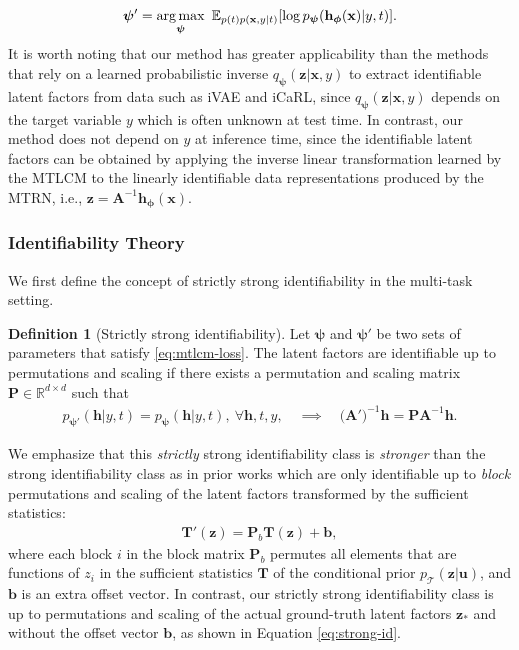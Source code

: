 \documentclass{article} %
\theoremstyle{plain}
\theoremstyle{definition}
\newtheorem{definition}[theorem]{Definition}
\theoremstyle{remark}
\begin{document}
\begin{align}\label{eq:mtlcm-loss}
    \boldsymbol{\psi}'=\operatorname*{arg\,max}_{\boldsymbol{\psi}}~\mathbb{E}_{p(t)p(\mathbf{x},y|t)}[\log p_{\boldsymbol{\psi}}(\mathbf{h}_{\boldsymbol{\phi}}(\mathbf{x})|y,t)].
\end{align}
It is worth noting that our method has greater applicability than the methods that rely on a learned probabilistic inverse $q_{\boldsymbol{\psi}}(\mathbf{z}|\mathbf{x},y)$ to extract identifiable latent factors from data such as iVAE and iCaRL, since $q_{\boldsymbol{\psi}}(\mathbf{z}|\mathbf{x},y)$ depends on the target variable $y$ which is often unknown at test time. In contrast, our method does not depend on $y$ at inference time, since the identifiable latent factors can be obtained by applying the inverse linear transformation learned by the MTLCM to the linearly identifiable data representations produced by the MTRN, i.e., $\mathbf{z}=\mathbf{A}^{-1}\mathbf{h}_{\boldsymbol{\phi}}(\mathbf{x})$.

\vspace{-0.5ex}
\subsubsection{Identifiability Theory}
\vspace{-0.5ex}
We first define the concept of strictly strong identifiability in the multi-task setting.
\begin{definition}[Strictly strong identifiability]\label{def:strong-id}
    Let $\boldsymbol{\psi}$ and $\boldsymbol{\psi}'$ be two sets of parameters that satisfy \eqref{eq:mtlcm-loss}. The latent factors are identifiable up to permutations and scaling if there exists a permutation and scaling matrix $\mathbf{P}\in\mathbb{R}^{d\times d}$ 
    such that 
    \begin{align}\label{eq:strong-id}
            p_{\boldsymbol{\psi}'}(\mathbf{h}|y,t)=p_{\boldsymbol{\psi}}(\mathbf{h}|y,t),~\forall \mathbf{h},t,y,
            \quad\implies\quad
            (\mathbf{A')}^{-1}\mathbf{h}=\mathbf{P}\mathbf{A}^{-1}\mathbf{h}.
    \end{align}
\end{definition}
\vspace{-0.5ex}
We emphasize that this \textit{strictly} strong identifiability class is \textit{stronger} than the strong identifiability class as in prior works \citep{Khemakhem_Kingma_Monti_Hyvarinen_2020,Lu_Wu_Hernandez-Lobato_Scholkopf_2022} which are only identifiable up to \textit{block} permutations and scaling of the latent factors transformed by the sufficient statistics:
\begin{align}
    \mathbf{T}'(\mathbf{z})=\mathbf{P}_b\mathbf{T}(\mathbf{z})+\mathbf{b},
\end{align}
where each block $i$ in the block matrix $\mathbf{P}_b$ permutes all elements that are functions of $z_i$ in the sufficient statistics $\mathbf{T}$ of the conditional prior $p_{\mathcal{T}}(\mathbf{z}|\mathbf{u})$, and $\mathbf{b}$ is an extra offset vector. In contrast, our strictly strong identifiability class is up to permutations and scaling of the actual ground-truth latent factors $\mathbf{z}_*$ and without the offset vector $\mathbf{b}$, as shown in Equation \eqref{eq:strong-id}.
\end{document}
